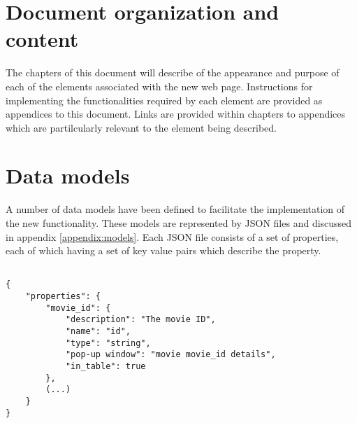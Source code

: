 \section{Document organization and content}

The chapters of this document will describe of the appearance and purpose of each of the
elements associated with the new web page. Instructions for implementing the 
functionalities required by each element are provided as appendices to this document. Links
are provided within chapters to appendices which are partilcularly relevant to the element 
being described.

\section{Data models}

A number of data models have been defined to facilitate the implementation of the new
functionality. These models are represented by JSON files and discussed in appendix 
\ref{appendix:models}. Each JSON file consists of a set of properties, each of which 
having a set of key value pairs which describe the property.

\begin{verbatim}
    
{ 
    "properties": {
        "movie_id": { 
            "description": "The movie ID",
            "name": "id",
            "type": "string",
            "pop-up window": "movie movie_id details",
            "in_table": true
        },
        (...)
    }
}

\end{verbatim}